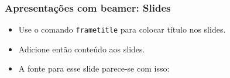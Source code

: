\begin{frame}
  \frametitle{Apresentações com beamer: Slides}
  \begin{itemize}
    \item Use o comando \texttt{frametitle} para colocar
          título nos slides.
    \item Adicione então conteúdo aos slides.
    \item A fonte para esse slide parece-se com isso:
  \end{itemize}
\end{frame}

